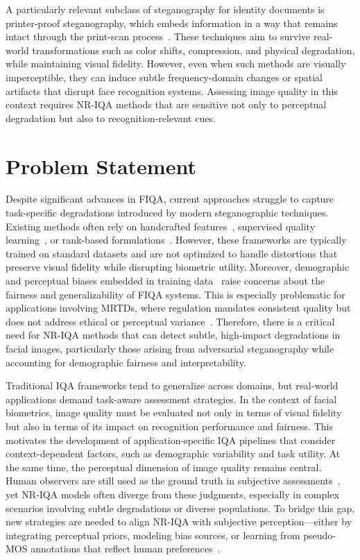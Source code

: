 A particularly relevant subclass of steganography for identity documents is printer-proof steganography, which embeds information in a way that remains intact through the print-scan process~\cite{codeface2021, stegastamp2020}. These techniques aim to survive real-world transformations such as color shifts, compression, and physical degradation, while maintaining visual fidelity. However, even when such methods are visually imperceptible, they can induce subtle frequency-domain changes or spatial artifacts that disrupt face recognition systems. Assessing image quality in this context requires NR-IQA methods that are sensitive not only to perceptual degradation but also to recognition-relevant cues.


\section{Problem Statement}\label{sec:problem_statement}

Despite significant advances in FIQA, current approaches struggle to capture task-specific degradations introduced by modern steganographic techniques. Existing methods often rely on handcrafted features~\cite{henniger2020biosig}, supervised quality learning~\cite{hernandez2019faceqnet, meng2021magface, terhorst2020serfiq}, or rank-based formulations~\cite{liu2017rankiqa}. However, these frameworks are typically trained on standard datasets and are not optimized to handle distortions that preserve visual fidelity while disrupting biometric utility. Moreover, demographic and perceptual biases embedded in training data~\cite{babnik2022} raise concerns about the fairness and generalizability of FIQA systems. This is especially problematic for applications involving MRTDs, where regulation mandates consistent quality but does not address ethical or perceptual variance~\cite{icao_2015, iso_iec29794-5_2010}. Therefore, there is a critical need for NR-IQA methods that can detect subtle, high-impact degradations in facial images, particularly those arising from adversarial steganography while accounting for demographic fairness and interpretability.

Traditional IQA frameworks tend to generalize across domains, but real-world applications demand task-aware assessment strategies. In the context of facial biometrics, image quality must be evaluated not only in terms of visual fidelity but also in terms of its impact on recognition performance and fairness. This motivates the development of application-specific IQA pipelines that consider context-dependent factors, such as demographic variability and task utility. At the same time, the perceptual dimension of image quality remains central. Human observers are still used as the ground truth in subjective assessments~\cite{ITU-R-BT500, mos2016}, yet NR-IQA models often diverge from these judgments, especially in complex scenarios involving subtle degradations or diverse populations. To bridge this gap, new strategies are needed to align NR-IQA with subjective perception—either by integrating perceptual priors, modeling bias sources, or learning from pseudo-MOS annotations that reflect human preferences~\cite{chen2021pseudo, jin2020pipal}.

